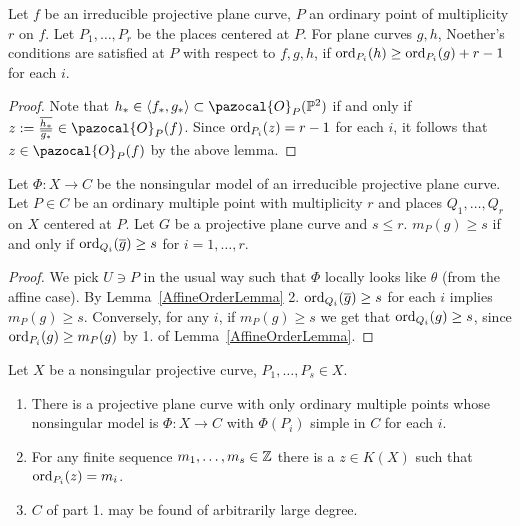     \begin{proposition}\label{NoethersConditionInTermsOfDivisors}
        Let $f$ be an irreducible projective plane curve, $P$ an ordinary point of multiplicity $r$ on $f$. Let $P_1,\dots,P_r$ be the places centered at $P$. For plane curves $g,h$, Noether's conditions are satisfied at $P$ with respect to $f,g,h$, if $\mathrm{ord}_{P_i}(h)\geq \mathrm{ord}_{P_i}(g)+r-1$ for each $i$. 
    \end{proposition}
    \begin{proof}
        Note that $h_\ast\in \langle f_\ast,g_\ast\rangle \subset \pazocal{O}_P(\Pp^2)$ if and only if $z:= \frac{\overline{h_\ast}}{\overline{g_\ast}}\in \pazocal{O}_P(f)$. Since $\mathrm{ord}_{P_i}(z) = r-1$ for each $i$, it follows that $z\in \pazocal{O}_P(f)$ by the above lemma.  
    \end{proof}
    \begin{lemma}\label{OrderAtPlacesCenteredAtOrdinaryMultiplePoint}
        Let $\Phi : X\rightarrow C$ be the nonsingular model of an irreducible projective plane curve. Let $P\in C$ be an ordinary multiple point with multiplicity $r$ and places $Q_1,\dots,Q_r$ on $X$ centered at $P$. Let $G$ be a projective plane curve and $s\leq r$. $m_P(g)\geq s$ if and only if $\mathrm{ord}_{Q_i}(\overline{g})\geq s $ for $i=1,\dots,r$.  
    \end{lemma}
    \begin{proof}
        We pick $U\ni P$ in the usual way such that $\Phi$ locally looks like $\theta$ (from the affine case). By Lemma~\ref{AffineOrderLemma} 2. $\mathrm{ord}_{Q_i}(\overline{g})\geq s$ for each $i$ implies $m_P(g)\geq s$. Conversely, for any $i$, if $m_P(g)\geq s$ we get that $\mathrm{ord}_{Q_i}(g)\geq s$, since $\mathrm{ord}_{P_i}(g)\geq m_P(g)$ by 1. of Lemma~\ref{AffineOrderLemma}.
    \end{proof}
    \begin{lemma}\label{TechnicalNonSingularCurveLemma}
        Let $X$ be a nonsingular projective curve, $P_1,\dots,P_s\in X$. 
        \begin{enumerate}
            \item There is a projective plane curve with only ordinary multiple points whose nonsingular model is $\Phi : X\rightarrow C$ with $\Phi(P_i)$ simple in $C$ for each $i$.
            \item For any finite sequence $m_1,\dots,m_s\in \mathbb{Z}$ there is a $z\in K(X)$ such that $\mathrm{ord}_{P_i}(z)=m_i$. 
            \item $C$ of part 1. may be found of arbitrarily large degree. 
        \end{enumerate}
    \end{lemma}
